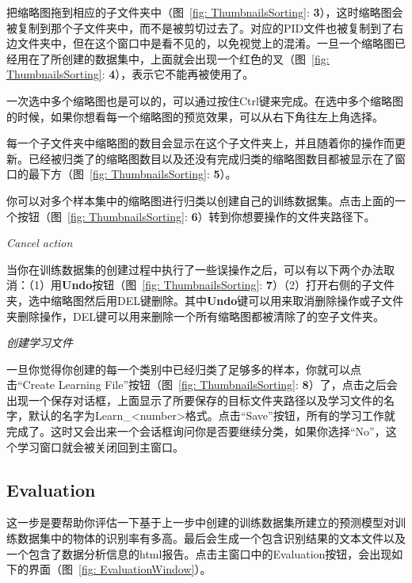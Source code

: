\documentclass[12pt]{article}
\begin{document}
把缩略图拖到相应的子文件夹中（图~\ref{fig: ThumbnailsSorting}: {\color{red}\textbf{3}}），这时缩略图会被复制到那个子文件夹中，而不是被剪切过去了。对应的PID文件也被复制到了右边文件夹中，但在这个窗口中是看不见的，以免视觉上的混淆。一旦一个缩略图已经用在了所创建的数据集中，上面就会出现一个红色的叉（图~\ref{fig: ThumbnailsSorting}: {\color{red}\textbf{4}}），表示它不能再被使用了。

一次选中多个缩略图也是可以的，可以通过按住Ctrl键来完成。在选中多个缩略图的时候，如果你想看每一个缩略图的预览效果，可以从右下角往左上角选择。

每一个子文件夹中缩略图的数目会显示在这个子文件夹上，并且随着你的操作而更新。已经被归类了的缩略图数目以及还没有完成归类的缩略图数目都被显示在了窗口的最下方（图~\ref{fig: ThumbnailsSorting}: {\color{red}\textbf{5}}）。

你可以对多个样本集中的缩略图进行归类以创建自己的训练数据集。点击上面的一个按钮（图~\ref{fig: ThumbnailsSorting}: {\color{red}\textbf{6}}）转到你想要操作的文件夹路径下。

\textit{Cancel action}

当你在训练数据集的创建过程中执行了一些误操作之后，可以有以下两个办法取消：（1）用\textbf{Undo}按钮（图~\ref{fig: ThumbnailsSorting}: {\color{red}\textbf{7}}）（2）打开右侧的子文件夹，选中缩略图然后用DEL键删除。其中\textbf{Undo}键可以用来取消删除操作或子文件夹删除操作，DEL键可以用来删除一个所有缩略图都被清除了的空子文件夹。

\textit{创建学习文件}

一旦你觉得你创建的每一个类别中已经归类了足够多的样本，你就可以点击“Create Learning File”按钮（图~\ref{fig: ThumbnailsSorting}: {\color{red}\textbf{8}}）了，点击之后会出现一个保存对话框，上面显示了所要保存的目标文件夹路径以及学习文件的名字，默认的名字为Learn\_<number>格式。点击“Save”按钮，所有的学习工作就完成了。这时又会出来一个会话框询问你是否要继续分类，如果你选择“No”，这个学习窗口就会被关闭回到主窗口。

\subsection{Evaluation}

这一步是要帮助你评估一下基于上一步中创建的训练数据集所建立的预测模型对训练数据集中的物体的识别率有多高。最后会生成一个包含识别结果的文本文件以及一个包含了数据分析信息的html报告。点击主窗口中的Evaluation按钮，会出现如下的界面（图~\ref{fig: EvaluationWindow}）。
\end{document}
